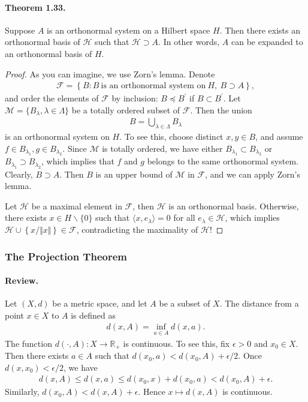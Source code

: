 \documentclass{article}
\begin{document}
\paragraph{Theorem 1.33.\label{thm:1.33}} Suppose $A$ is an orthonormal system on a Hilbert space $H$. Then there exists an orthonormal basis of $\mathscr{H}$ such that $\mathscr{H}\supset A$. In other words, $A$ can be expanded to an orthonormal basis of $H$.
\begin{proof}
As you can imagine, we use Zorn's lemma. Denote
\begin{align*}
	\mathcal{F} = \left\{B:B\ \text{is an orthonormal system on}\ H,\ B\supset A\right\},
\end{align*}
and order the elements of $\mathcal{F}$ by inclusion: $B\preceq B^\prime$ if $B\subset B^\prime$. Let $\mathcal{M}=\{B_\lambda,\lambda\in\Lambda\}$ be a totally ordered subset of $\mathcal{F}$. Then the union
\begin{align*}
	B=\bigcup_{\lambda\in\Lambda} B_\lambda
\end{align*}
is an orthonormal system on $H$. To see this, choose distinct $x,y\in B$, and assume $f\in B_{\lambda_1},g\in B_{\lambda_2}$. Since $\mathcal{M}$ is totally ordered, we have either $B_{\lambda_1}\subset B_{\lambda_2}$ or $B_{\lambda_1}\supset B_{\lambda_2}$, which implies that $f$ and $g$ belongs to the same orthonormal system. Clearly, $B\supset A$. Then $B$ is an upper bound of $\mathcal{M}$ in $\mathcal{F}$, and we can apply Zorn's lemma.

Let $\mathscr{H}$ be a maximal element in $\mathcal{F}$, then $\mathscr{H}$ is an orthonormal basis. Otherwise, there exists $x\in H\backslash\{0\}$ such that $\langle x,e_\lambda\rangle=0$ for all $e_\lambda\in\mathscr{H}$, which implies $\mathscr{H}\cup\left\{x/\Vert x\Vert\right\}\in\mathcal{F}$, contradicting the maximality of $\mathscr{H}$!
\end{proof}

\subsubsection{The Projection Theorem}
\paragraph{Review.} Let $(X,d)$ be a metric space, and let $A$ be a subset of $X$. The distance from a point $x\in X$ to $A$ is defined as
\begin{align*}
	d(x,A) = \inf_{a\in A} d(x,a).
\end{align*}
The function $d(\cdot, A):X\to\mathbb{R}_+$ is continuous. To see this, fix $\epsilon > 0$ and $x_0\in X$. Then there exists $a\in A$ such that $d(x_0,a) < d(x_0,A) + \epsilon/2$. Once $d(x,x_0)<\epsilon/2$, we have
\begin{align*}
	d(x,A) \leq d(x,a) \leq d(x_0,x) + d(x_0,a) < d(x_0,A) + \epsilon.
\end{align*}
Similarly, $d(x_0,A) < d(x,A) + \epsilon$. Hence $x\mapsto d(x,A)$ is continuous. 
\end{document}
